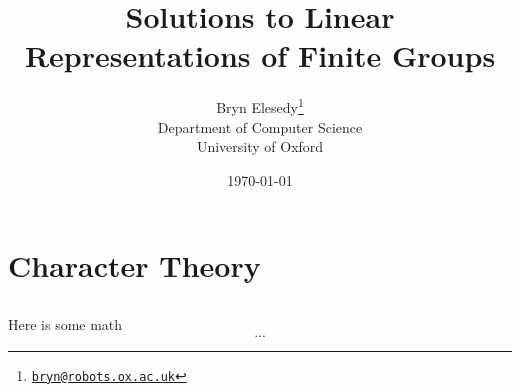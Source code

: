 \documentclass[a4paper, oneside, 10pt]{article}
\title{Solutions to Linear Representations of Finite Groups}
\author{%
    Bryn Elesedy\thanks{\href{mailto:bryn@robots.ox.ac.uk}{\texttt{bryn@robots.ox.ac.uk}}}\\
Department of Computer Science\\
University of Oxford}
\date{\today}
\numberwithin{Answer}{section}
\numberwithin{Exercise}{section}
\begin{document}
\maketitle
\tableofcontents
\clearpage
\setcounter{section}{1}

\section{Character Theory}
\subsection{}
Here is some math
\[
    ...
\]


\nocite{*}


\end{document}
